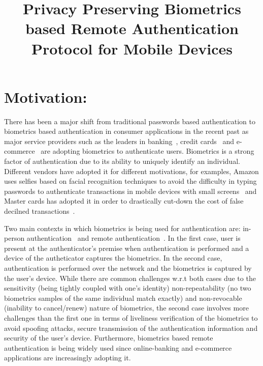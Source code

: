 \documentclass[10pt]{article}
\title{
\vspace{-20.mm}
Privacy Preserving Biometrics based Remote Authentication Protocol for Mobile Devices}
\begin{document}
\maketitle
\section{Motivation:}
There has been a major shift from traditional passwords based authentication to biometrics based authentication in consumer applications in the 
recent past as major service providers such as the leaders in banking~\cite{citi, hsbc, usaa}, credit cards~\cite{mastercard} and 
e-commerce~\cite{amazon, alibaba} are adopting biometrics to authenticate users.
Biometrics is a strong factor of authentication due to its ability to uniquely identify an individual. Different 
vendors have adopted it for different motivations, for examples, Amazon uses selfies based on facial recognition techniques to avoid the difficulty 
in typing passwords to authenticate transactions in mobile devices with small screens~\cite{amazon} and  Master cards has adopted it in order to 
drastically cut-down the cost of false decilned transactions~\cite{mastercard}.

Two main contexts in which biometrics is being used for authentication are: in-person authentication~\cite{google} and remote 
authentication~\cite{hsbc}. In the first case, user is present at the authenticator's premise when authentication is performed and a device of the 
autheticator captures the 
biometrics. In the second case, authentication is performed over the network and the biometrics is captured by the user's device. 
While there are common challenges w.r.t both cases due to the sensitivity (being tightly coupled with one's identity) non-repeatability (no 
two biometrics samples of the same individual match exactly) and non-revocable (inability to cancel/renew) nature of biometrics, the second case 
involves more challenges than the first one in terms of liveliness verification of the biometrics to avoid spoofing attacks, secure 
transmission of the authentication information and security of the user's device. Furthermore, biometrics based remote authentication is being widely 
used since online-banking and e-commerce applications are increasingly adopting it.
\end{document}
